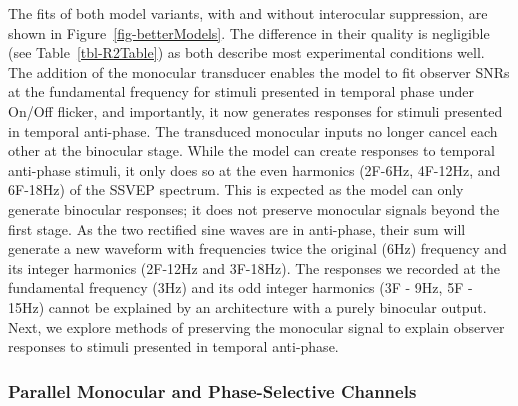\documentclass[review,
  12pt,
]{elsarticle}
\begin{document}
The fits of both model variants, with and without interocular
suppression, are shown in Figure~\ref{fig-betterModels}. The difference
in their quality is negligible (see Table~\ref{tbl-R2Table}) as both
describe most experimental conditions well. The addition of the
monocular transducer enables the model to fit observer SNRs at the
fundamental frequency for stimuli presented in temporal phase under
On/Off flicker, and importantly, it now generates responses for stimuli
presented in temporal anti-phase. The transduced monocular inputs no
longer cancel each other at the binocular stage. While the model can
create responses to temporal anti-phase stimuli, it only does so at the
even harmonics (2F-6Hz, 4F-12Hz, and 6F-18Hz) of the SSVEP spectrum.
This is expected as the model can only generate binocular responses; it
does not preserve monocular signals beyond the first stage. As the two
rectified sine waves are in anti-phase, their sum will generate a new
waveform with frequencies twice the original (6Hz) frequency and its
integer harmonics (2F-12Hz and 3F-18Hz). The responses we recorded at
the fundamental frequency (3Hz) and its odd integer harmonics (3F - 9Hz,
5F - 15Hz) cannot be explained by an architecture with a purely
binocular output. Next, we explore methods of preserving the monocular
signal to explain observer responses to stimuli presented in temporal
anti-phase.

\subsubsection{Parallel Monocular and Phase-Selective
Channels}\label{parallel-monocular-and-phase-selective-channels}
\end{document}
